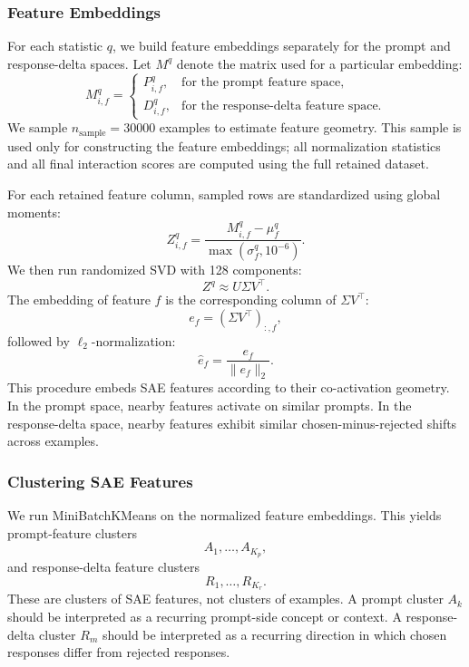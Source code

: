 \documentclass{article} %
\begin{document}
\subsubsection{Feature Embeddings}
\label{app:pcfs-feature-embeddings}

For each statistic $q$, we build feature embeddings separately for the prompt and response-delta spaces. Let $M^q$ denote the matrix used for a particular embedding:
\begin{equation}
M^q_{i,f} =
\begin{cases}
P^q_{i,f}, & \text{for the prompt feature space}, \\
D^q_{i,f}, & \text{for the response-delta feature space}.
\end{cases}
\end{equation}
We sample $n_{\text{sample}}=30000$ examples to estimate feature geometry. This sample is used only for constructing the feature embeddings; all normalization statistics and all final interaction scores are computed using the full retained dataset.

For each retained feature column, sampled rows are standardized using global moments:
\begin{equation}
Z^q_{i,f} = \frac{M^q_{i,f} - \mu^q_f}{\max(\sigma^q_f,10^{-6})}.
\end{equation}
We then run randomized SVD with 128 components:
\begin{equation}
Z^q \approx U \Sigma V^\top.
\end{equation}
The embedding of feature $f$ is the corresponding column of $\Sigma V^\top$:
\begin{equation}
e_f = (\Sigma V^\top)_{:,f},
\end{equation}
followed by $\ell_2$-normalization:
\begin{equation}
\hat e_f = \frac{e_f}{\|e_f\|_2}.
\end{equation}
This procedure embeds SAE features according to their co-activation geometry. In the prompt space, nearby features activate on similar prompts. In the response-delta space, nearby features exhibit similar chosen-minus-rejected shifts across examples.

\subsubsection{Clustering SAE Features}
\label{app:pcfs-clustering}

We run MiniBatchKMeans on the normalized feature embeddings. This yields prompt-feature clusters
\begin{equation}
A_1,\ldots,A_{K_p},
\end{equation}
and response-delta feature clusters
\begin{equation}
R_1,\ldots,R_{K_r}.
\end{equation}
These are clusters of SAE features, not clusters of examples. A prompt cluster $A_k$ should be interpreted as a recurring prompt-side concept or context. A response-delta cluster $R_m$ should be interpreted as a recurring direction in which chosen responses differ from rejected responses.
\end{document}
